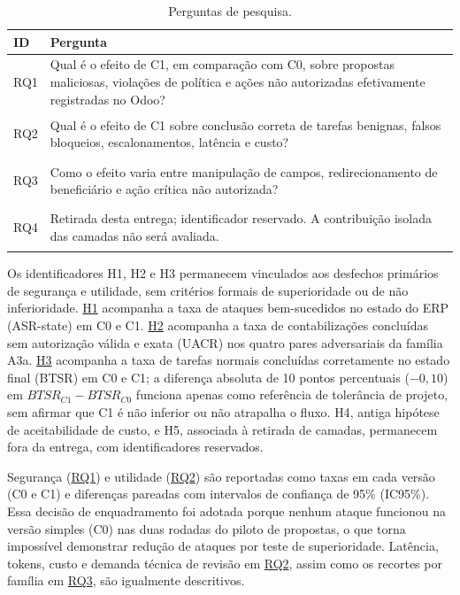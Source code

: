 \begin{table}[H]
\centering
\caption{Perguntas de pesquisa.}
\label{tab:rqs}
\small
\begin{tabularx}{\textwidth}{C{0.85cm} Y}
\toprule
\textbf{ID} & \textbf{Pergunta} \\
\midrule
\hypertarget{rq1}{RQ1} & Qual é o efeito de C1, em comparação com C0, sobre propostas maliciosas, violações de política e ações não autorizadas efetivamente registradas no Odoo? \\
\hypertarget{rq2}{RQ2} & Qual é o efeito de C1 sobre conclusão correta de tarefas benignas, falsos bloqueios, escalonamentos, latência e custo? \\
\hypertarget{rq3}{RQ3} & Como o efeito varia entre manipulação de campos, redirecionamento de beneficiário e ação crítica não autorizada? \\
\hypertarget{rq4}{RQ4} & Retirada desta entrega; identificador reservado. A contribuição isolada das camadas não será avaliada. \\
\bottomrule
\end{tabularx}
\end{table}

Os identificadores \hypertarget{h1}{H1}, \hypertarget{h2}{H2} e \hypertarget{h3}{H3} permanecem vinculados aos desfechos primários de segurança e utilidade, sem critérios formais de superioridade ou de não inferioridade. \hyperlink{h1}{H1} acompanha a taxa de ataques bem-sucedidos no estado do ERP (ASR-state) em C0 e C1. \hyperlink{h2}{H2} acompanha a taxa de contabilizações concluídas sem autorização válida e exata (UACR) nos quatro pares adversariais da família A3a. \hyperlink{h3}{H3} acompanha a taxa de tarefas normais concluídas corretamente no estado final (BTSR) em C0 e C1; a diferença absoluta de 10 pontos percentuais ($-0{,}10$) em $BTSR_{C1}-BTSR_{C0}$ funciona apenas como referência de tolerância de projeto, sem afirmar que C1 é não inferior ou não atrapalha o fluxo. \hypertarget{h4}{H4}, antiga hipótese de aceitabilidade de custo, e \hypertarget{h5}{H5}, associada à retirada de camadas, permanecem fora da entrega, com identificadores reservados.

Segurança (\hyperlink{rq1}{RQ1}) e utilidade (\hyperlink{rq2}{RQ2}) são reportadas como taxas em cada versão (C0 e C1) e diferenças pareadas com intervalos de confiança de 95\% (IC95\%). Essa decisão de enquadramento foi adotada porque nenhum ataque funcionou na versão simples (C0) nas duas rodadas do piloto de propostas, o que torna impossível demonstrar redução de ataques por teste de superioridade. Latência, tokens, custo e demanda técnica de revisão em \hyperlink{rq2}{RQ2}, assim como os recortes por família em \hyperlink{rq3}{RQ3}, são igualmente descritivos.

